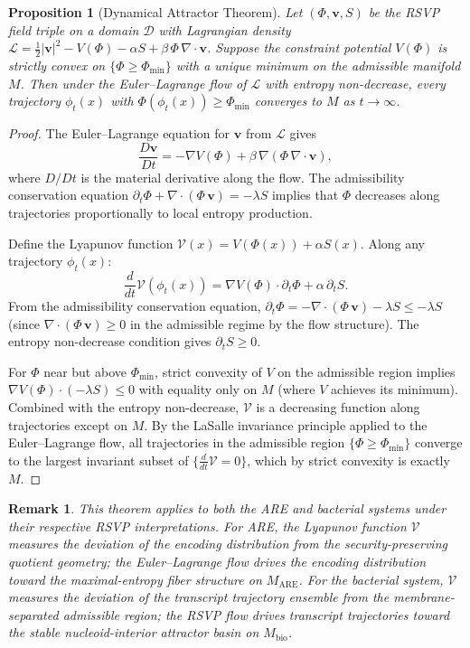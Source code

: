 \documentclass[12pt, a4paper]{article}
\theoremstyle{essaystyle}
\newtheorem{proposition}{Proposition}
\newtheorem*{remark}{Remark}
\begin{document}
\begin{proposition}[Dynamical Attractor Theorem]
Let $(\Phi, \mathbf{v}, S)$ be the RSVP field triple on a domain $\mathcal{D}$
with Lagrangian density $\mathcal{L} = \tfrac{1}{2}|\mathbf{v}|^2 - V(\Phi) -
\alpha S + \beta\, \Phi\, \nabla \cdot \mathbf{v}$. Suppose the constraint potential
$V(\Phi)$ is strictly convex on $\{\Phi \geq \Phi_{\min}\}$ with a unique minimum on
the admissible manifold $M$. Then under the Euler--Lagrange flow of $\mathcal{L}$
with entropy non-decrease, every trajectory $\phi_t(x)$ with $\Phi(\phi_t(x)) \geq
\Phi_{\min}$ converges to $M$ as $t \to \infty$.
\end{proposition}

\begin{proof}
The Euler--Lagrange equation for $\mathbf{v}$ from $\mathcal{L}$ gives
\[
\frac{D\mathbf{v}}{Dt} = -\nabla V(\Phi) + \beta\,\nabla(\Phi\, \nabla \cdot \mathbf{v}),
\]
where $D/Dt$ is the material derivative along the flow. The admissibility conservation
equation $\partial_t \Phi + \nabla \cdot (\Phi\, \mathbf{v}) = -\lambda S$ implies
that $\Phi$ decreases along trajectories proportionally to local entropy production.

Define the Lyapunov function $\mathcal{V}(x) = V(\Phi(x)) + \alpha S(x)$. Along
any trajectory $\phi_t(x)$:
\[
\frac{d}{dt}\mathcal{V}(\phi_t(x))
= \nabla V(\Phi) \cdot \partial_t \Phi + \alpha\, \partial_t S.
\]
From the admissibility conservation equation, $\partial_t \Phi = -\nabla \cdot
(\Phi\,\mathbf{v}) - \lambda S \leq -\lambda S$ (since $\nabla \cdot (\Phi\,\mathbf{v})
\geq 0$ in the admissible regime by the flow structure). The entropy non-decrease
condition gives $\partial_t S \geq 0$.

For $\Phi$ near but above $\Phi_{\min}$, strict convexity of $V$ on the admissible
region implies $\nabla V(\Phi) \cdot (-\lambda S) \leq 0$ with equality only on $M$
(where $V$ achieves its minimum). Combined with the entropy non-decrease, $\mathcal{V}$
is a decreasing function along trajectories except on $M$. By the LaSalle invariance
principle applied to the Euler--Lagrange flow, all trajectories in the admissible
region $\{\Phi \geq \Phi_{\min}\}$ converge to the largest invariant subset of
$\{\frac{d}{dt}\mathcal{V} = 0\}$, which by strict convexity is exactly $M$.
\end{proof}

\begin{remark}
This theorem applies to both the ARE and bacterial systems under their respective RSVP
interpretations. For ARE, the Lyapunov function $\mathcal{V}$ measures the deviation
of the encoding distribution from the security-preserving quotient geometry; the
Euler--Lagrange flow drives the encoding distribution toward the maximal-entropy fiber
structure on $M_{\mathrm{ARE}}$. For the bacterial system, $\mathcal{V}$ measures the
deviation of the transcript trajectory ensemble from the membrane-separated admissible
region; the RSVP flow drives transcript trajectories toward the stable nucleoid-interior
attractor basin on $M_{\mathrm{bio}}$.
\end{remark}
\end{document}
